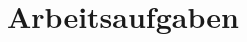 \chapter{Arbeitsaufgaben}
\newpage
\newpage
\newpage
\newpage
\newpage
\newpage
\newpage
\newpage
\newpage
